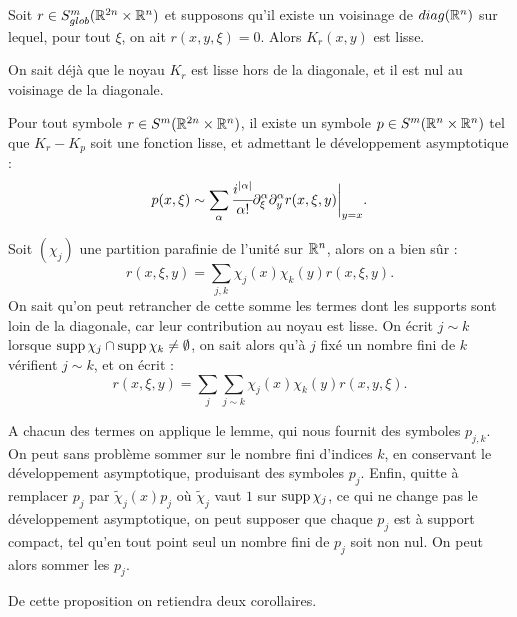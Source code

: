 \begin{lem}
	Soit $r\in S^m_{glob}(\mathbb{R}^{2n}\times \mathbb{R}^n)$ et supposons qu'il existe un voisinage de $diag(\mathbb{R}^n)$ sur lequel, pour tout $\xi$, on ait $ r(x,y,\xi)=0$. Alors $K_r(x,y)$ est lisse.
\end{lem}
\begin{preuve}
	On sait déjà que le noyau $K_r$ est lisse hors de la diagonale, et il est nul au voisinage de la diagonale.
\end{preuve}

\begin{prop}
	Pour tout symbole $r \in S^m(\mathbb{R}^{2n}\times \mathbb{R}^n)$, il existe un symbole $p \in S^m(\mathbb{R}^n \times \mathbb{R}^n)$ tel que $K_r-K_p$ soit une fonction lisse, et admettant le développement asymptotique :
	\begin{equation*}
	p(x,\xi) \sim \sum_{\alpha}\cfrac{i^{|\alpha|}}{\alpha!}\partial^{\alpha}_{\xi}\partial^{\alpha}_yr(x,\xi,y)\biggl|_{y=x}.
	\end{equation*}
\end{prop}
\begin{preuve}
	Soit $(\chi_j)$ une partition parafinie de l'unité sur $\mathbb{R}^n$, alors on a bien sûr :
	\begin{equation*}
		r(x,\xi,y)=\sum_{j,k}\chi_j(x)\chi_k(y)r(x,\xi,y).
	\end{equation*}
	On sait qu'on peut retrancher de cette somme les termes dont les supports sont loin de la diagonale, car leur contribution au noyau est lisse. On écrit $j \sim k$ lorsque $\operatorname{supp} \chi_j \cap\operatorname{supp} \chi_k \neq \emptyset$, on sait alors qu'à $j$ fixé un nombre fini de $k$ vérifient $j \sim k$, et on écrit :
	\begin{equation*}
		r(x,\xi,y) = \sum_j \sum_{j \sim k}\chi_j(x)\chi_k(y)r(x,y,\xi).
	\end{equation*}
	
	A chacun des termes on applique le lemme, qui nous fournit des symboles $p_{j,k}$. On peut sans problème sommer sur le nombre fini d'indices $k$, en conservant le développement asymptotique, produisant des symboles $p_j$. Enfin, quitte à remplacer $p_j$ par $\tilde{\chi}_j(x)p_j$ où $\tilde{\chi}_j$ vaut $1$ sur $\operatorname{supp} \chi_j$, ce qui ne change pas le développement asymptotique, on peut supposer que chaque $p_j$ est à support compact, tel qu'en tout point seul un nombre fini de $p_j$ soit non nul.
	On peut alors sommer les $p_j$.
\end{preuve}

De cette proposition on retiendra deux corollaires.

